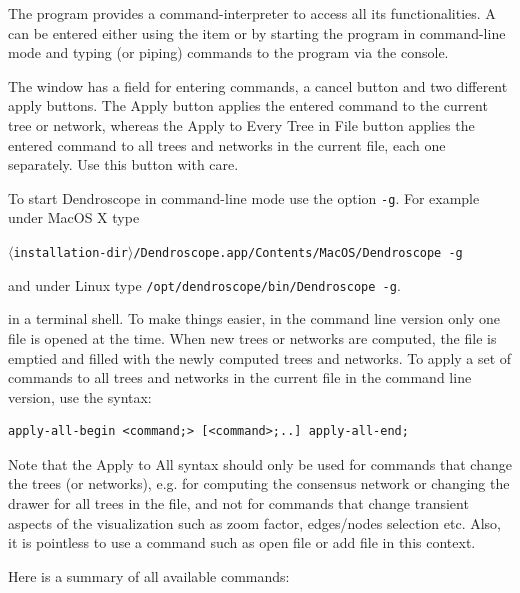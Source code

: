 \documentclass[11pt]{article}
\begin{document}

The program provides a command-interpreter to access all its functionalities. A 
can be entered either using the  item
or by starting the program in command-line mode and typing (or piping) commands to the program via the console.

The  window has a field for entering commands,
a cancel button and two  different apply buttons.
The {\sf Apply} button  applies the entered command to the current tree or network,
whereas the {\sf Apply to Every Tree in File} button 
applies the entered command
to all trees and networks in the current file, each one separately. Use this button with care.

To start Dendroscope in command-line mode use the option \verb"-g". For example under MacOS X type 

$\langle$\verb"installation-dir"$\rangle$\verb"/Dendroscope.app/Contents/MacOS/Dendroscope -g"

and under Linux type \verb"/opt/dendroscope/bin/Dendroscope -g".

in a terminal shell. To make things easier, in the command line version only one file is opened at the time. When new trees or networks are computed, the file is emptied and filled with the newly computed trees and networks.
To apply a set of commands to all trees and networks in the current file in the command line version, use the syntax:
\begin{verbatim}
apply-all-begin <command;> [<command>;..] apply-all-end;
\end{verbatim}
Note that the {\sf Apply to All} syntax should only be used  
for commands that change the trees (or networks), e.g. for computing the consensus network  or changing the drawer for all trees in the file,  and not for commands that change
transient aspects of the visualization such as zoom factor, edges/nodes selection etc.
Also, it is pointless to use a command such as {\sf open file} or {\sf add file} in this context.

Here is a summary of all available commands:
\end{document}
